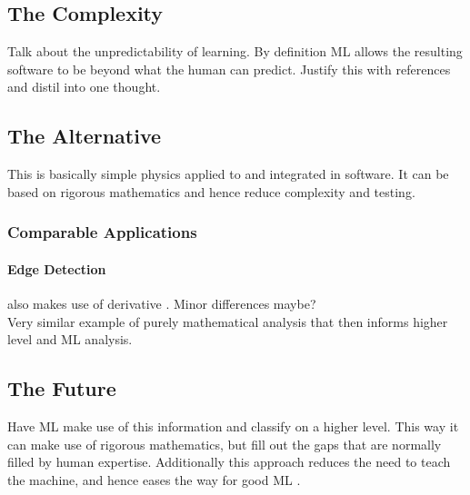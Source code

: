 \documentclass[main.tex]{subfiles}
\begin{document}
    \subsection{The Complexity}
    
      Talk about the unpredictability of learning. By definition ML allows the resulting software to be beyond what the human can predict. Justify this with references and distil into one thought.
    
    \subsection{The Alternative}
    
      This is basically simple physics applied to and integrated in software. It can be based on rigorous mathematics and hence reduce complexity and testing.
    
    \subsubsection*{Comparable Applications}
    
      \paragraph{Edge Detection} %
      also makes use of derivative \cite{}. Minor differences maybe? \\
      Very similar example of purely mathematical analysis that then informs higher level and ML analysis.
    
    \subsection{The Future}
    
      Have ML make use of this information and classify on a higher level. This way it can make use of rigorous mathematics, but fill out the gaps that are normally filled by human expertise. Additionally this approach reduces the need to teach the machine, and hence eases the way for good ML \cite{}.
    
\end{document}
